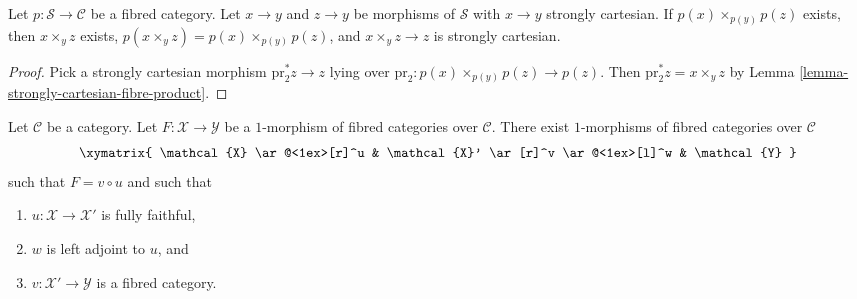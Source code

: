 \begin{lemma}
\label{lemma-fibred-category-representable-goes-up}
Let $p : \mathcal{S} \to \mathcal{C}$ be a fibred category.
Let $x \to y$ and $z \to y$ be morphisms of $\mathcal{S}$
with $x \to y$ strongly cartesian. If $p(x) \times_{p(y)} p(z)$ exists,
then $x \times_y z$ exists, $p(x \times_y z) = p(x) \times_{p(y)} p(z)$,
and $x \times_y z \to z$ is strongly cartesian.
\end{lemma}

\begin{proof}
Pick a strongly cartesian morphism
$\text{pr}_2^*z \to z$ lying over
$\text{pr}_2 : p(x) \times_{p(y)} p(z) \to p(z)$. Then
$\text{pr}_2^*z = x \times_y z$ by
Lemma \ref{lemma-strongly-cartesian-fibre-product}.
\end{proof}

\begin{lemma}
\label{lemma-ameliorate-morphism-fibred-categories}
Let $\mathcal{C}$ be a category. Let $F : \mathcal{X} \to \mathcal{Y}$
be a $1$-morphism of fibred categories over $\mathcal{C}$.
There exist $1$-morphisms of fibred categories over $\mathcal{C}$
$$
\xymatrix{
\mathcal{X} \ar@<1ex>[r]^u &
\mathcal{X}' \ar[r]^v \ar@<1ex>[l]^w & \mathcal{Y}
}
$$
such that $F = v \circ u$ and such that
\begin{enumerate}
\item $u : \mathcal{X} \to \mathcal{X}'$ is fully faithful,
\item $w$ is left adjoint to $u$, and
\item $v : \mathcal{X}' \to \mathcal{Y}$ is a fibred category.
\end{enumerate}
\end{lemma}

